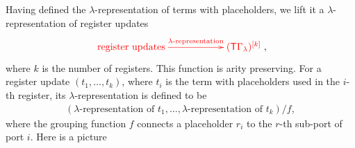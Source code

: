 
Having defined the $\lambda$-representation of terms with placeholders, we lift it a $\lambda$-representation of  register updates
\begin{align}\label{eq:lambda-representation-regup}
\ranked{
    \xymatrix@C=2cm{
 \text{register updates}    \ar[r]^-{\text{$\lambda$-representation}} &
 \mati k {(\tmonad\Gamma_\lambda)}
}
},
\end{align}
where $k$ is the number of registers. This function is arity preserving. 
For a register update $(t_1,\ldots,t_k)$, where $t_i$ is the term with placeholders used in the $i$-th register,  its $\lambda$-representation is defined to be 
\begin{align*}
(\text{$\lambda$-representation of $t_1$},\ldots,\text{$\lambda$-representation of $t_k$})/f ,
\end{align*}
 where the grouping function $f$ connects a placeholder $r_i$ to the $r$-th sub-port of port $i$. 
Here is a picture


